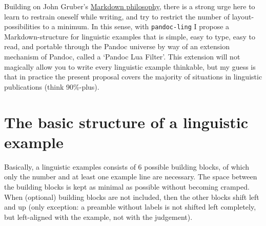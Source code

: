\documentclass[
]{article}
\begin{document}
Building on John Gruber's
\href{https://daringfireball.net/projects/markdown/syntax}{Markdown
philosophy}, there is a strong urge here to learn to restrain oneself
while writing, and try to restrict the number of layout-possibilities to
a minimum. In this sense, with \texttt{pandoc-ling} I propose a
Markdown-structure for linguistic examples that is simple, easy to type,
easy to read, and portable through the Pandoc universe by way of an
extension mechanism of Pandoc, called a `Pandoc Lua Filter'. This
extension will not magically allow you to write every linguistic example
thinkable, but my guess is that in practice the present proposal covers
the majority of situations in linguistic publications (think 90\%-plus).

\hypertarget{the-basic-structure-of-a-linguistic-example}{%
\section{The basic structure of a linguistic
example}\label{the-basic-structure-of-a-linguistic-example}}

Basically, a linguistic examples consists of 6 possible building blocks,
of which only the number and at least one example line are necessary.
The space between the building blocks is kept as minimal as possible
without becoming cramped. When (optional) building blocks are not
included, then the other blocks shift left and up (only exception: a
preamble without labels is not shifted left completely, but left-aligned
with the example, not with the judgement).
\end{document}
